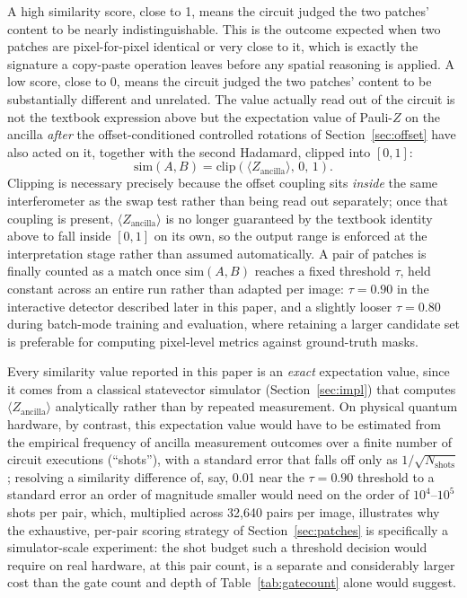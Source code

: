 \documentclass[conference]{IEEEtran}
\begin{document}
A high similarity score, close to 1, means the circuit judged the two patches' content to be nearly indistinguishable. This is the outcome expected when two patches are pixel-for-pixel identical or very close to it, which is exactly the signature a copy-paste operation leaves before any spatial reasoning is applied. A low score, close to 0, means the circuit judged the two patches' content to be substantially different and unrelated. The value actually read out of the circuit is not the textbook expression above but the expectation value of Pauli-$Z$ on the ancilla \emph{after} the offset-conditioned controlled rotations of Section~\ref{sec:offset} have also acted on it, together with the second Hadamard, clipped into $[0,1]$:
\begin{equation}
\mathrm{sim}(A,B) = \mathrm{clip}\left(\langle Z_{\text{ancilla}}\rangle,\, 0,\, 1\right).
\label{eq:sim}
\end{equation}
Clipping is necessary precisely because the offset coupling sits \emph{inside} the same interferometer as the swap test rather than being read out separately; once that coupling is present, $\langle Z_{\text{ancilla}}\rangle$ is no longer guaranteed by the textbook identity above to fall inside $[0,1]$ on its own, so the output range is enforced at the interpretation stage rather than assumed automatically. A pair of patches is finally counted as a match once $\mathrm{sim}(A,B)$ reaches a fixed threshold $\tau$, held constant across an entire run rather than adapted per image: $\tau = 0.90$ in the interactive detector described later in this paper, and a slightly looser $\tau = 0.80$ during batch-mode training and evaluation, where retaining a larger candidate set is preferable for computing pixel-level metrics against ground-truth masks.

Every similarity value reported in this paper is an \emph{exact} expectation value, since it comes from a classical statevector simulator (Section~\ref{sec:impl}) that computes $\langle Z_{\text{ancilla}}\rangle$ analytically rather than by repeated measurement. On physical quantum hardware, by contrast, this expectation value would have to be estimated from the empirical frequency of ancilla measurement outcomes over a finite number of circuit executions (``shots''), with a standard error that falls off only as $1/\sqrt{N_{\text{shots}}}$; resolving a similarity difference of, say, 0.01 near the $\tau = 0.90$ threshold to a standard error an order of magnitude smaller would need on the order of $10^4$--$10^5$ shots per pair, which, multiplied across 32,640 pairs per image, illustrates why the exhaustive, per-pair scoring strategy of Section~\ref{sec:patches} is specifically a simulator-scale experiment: the shot budget such a threshold decision would require on real hardware, at this pair count, is a separate and considerably larger cost than the gate count and depth of Table~\ref{tab:gatecount} alone would suggest.
\end{document}
